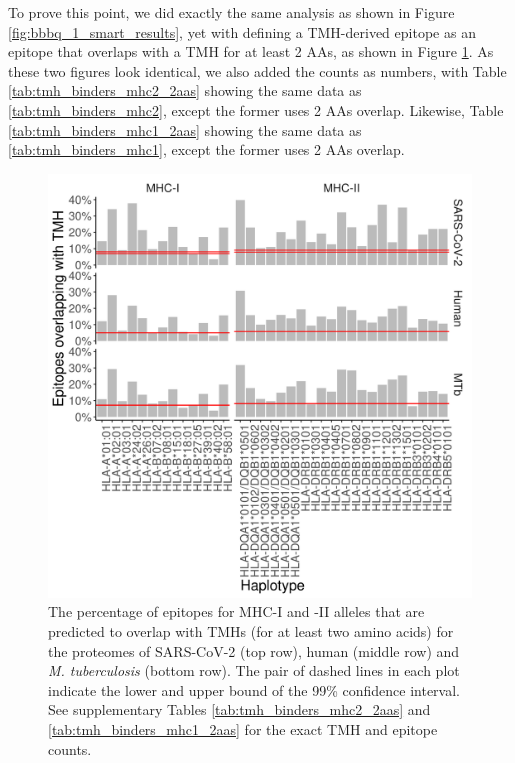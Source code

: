 To prove this point, we did exactly the same analysis 
as shown in Figure \ref{fig:bbbq_1_smart_results},
yet with defining a TMH-derived epitope as an epitope that overlaps with a TMH
for at least 2 AAs, as shown in Figure \ref{fig:bbbq_1_smart_results_2aas}.
As these two figures look identical, 
we also added the counts as numbers,
with Table \ref{tab:tmh_binders_mhc2_2aas} showing the same data
as \ref{tab:tmh_binders_mhc2}, except the former uses 2 AAs overlap.
Likewise, Table \ref{tab:tmh_binders_mhc1_2aas} showing the same data
as \ref{tab:tmh_binders_mhc1}, except the former uses 2 AAs overlap.

\begin{figure}[!htbp]
  \includegraphics[width=\textwidth]{bbbq_1_smart_2aa_results/fig_f_tmh_2_panel.png}
  \caption{
    The percentage of epitopes for MHC-I and -II alleles that are predicted to 
    overlap with TMHs (for at least two amino acids) 
    for the proteomes of SARS-CoV-2 (top row), human (middle 
    row) and \emph{M. tuberculosis} (bottom row).
    The pair of dashed lines in each plot indicate the lower and upper bound of the 99\% confidence interval.
    See supplementary Tables \ref{tab:tmh_binders_mhc2_2aas} and \ref{tab:tmh_binders_mhc1_2aas}
    for the exact TMH and  epitope counts.
  }
  \label{fig:bbbq_1_smart_results_2aas}
\end{figure}





\clearpage
